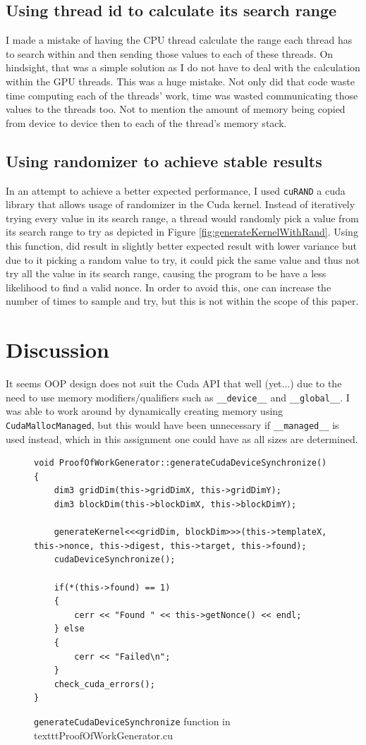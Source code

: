 \documentclass[a4paper]{article}
\begin{document}
\subsection{Using thread id to calculate its search range}
I made a mistake of having the CPU thread calculate the range each thread has to search within and then sending those values to each of these threads. On hindsight, that was a simple solution as I do not have to deal with the calculation within the GPU threads. This was a huge mistake. Not only did that code waste time computing each of the threads' work, time was wasted communicating those values to the threads too. Not to mention the amount of memory being copied from device to device then to each of the thread's memory stack.

\subsection{Using randomizer to achieve stable results}
In an attempt to achieve a better expected performance, I used \texttt{cuRAND} a cuda library that allows usage of randomizer in the Cuda kernel. Instead of iteratively trying every value in its search range, a thread would randomly pick a value from its search range to try as depicted in Figure \ref{fig:generateKernelWithRand}. Using this function, did result in slightly better expected result with lower variance but due to it picking a random value to try, it could pick the same value and thus not try all the value in its search range, causing the program to be have a less likelihood to find a valid nonce. In order to avoid this, one can increase the number of times to sample and try, but this is not within the scope of this paper.

\section{Discussion}
It seems OOP design does not suit the Cuda API that well (yet...) due to the need to use memory modifiers/qualifiers such as \texttt{\_\_device\_\_} and \texttt{\_\_global\_\_}. I was able to work around by dynamically creating memory using \texttt{CudaMallocManaged}, but this would have been unnecessary if \texttt{\_\_managed\_\_} is used instead, which in this assignment one could have as all sizes are determined. 

\begin{figure}
\begin{lstlisting}
void ProofOfWorkGenerator::generateCudaDeviceSynchronize()
{
    dim3 gridDim(this->gridDimX, this->gridDimY);
    dim3 blockDim(this->blockDimX, this->blockDimY);

    generateKernel<<<gridDim, blockDim>>>(this->templateX, this->nonce, this->digest, this->target, this->found);
    cudaDeviceSynchronize();

    if(*(this->found) == 1)
    {
        cerr << "Found " << this->getNonce() << endl;
    } else 
    {
        cerr << "Failed\n";
    }
    check_cuda_errors();
}
\end{lstlisting}
\caption{\label{fig:generateCudaDeviceSynchronize} \texttt{generateCudaDeviceSynchronize} function in texttt{ProofOfWorkGenerator.cu}}
\end{figure}
\end{document}
